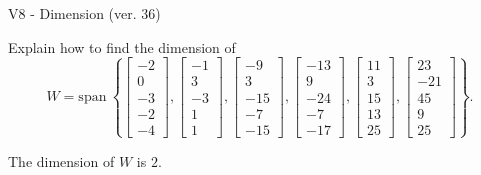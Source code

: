 \begin{exercise}
  \begin{exerciseTitle}V8 - Dimension (ver. 36)\end{exerciseTitle}
  \begin{exerciseStatement}
    Explain how to find the dimension of 
\[W=\mathrm{span}\ \left\{\left[\begin{array}{r}
-2 \\
0 \\
-3 \\
-2 \\
-4
\end{array}\right] , \left[\begin{array}{r}
-1 \\
3 \\
-3 \\
1 \\
1
\end{array}\right] , \left[\begin{array}{r}
-9 \\
3 \\
-15 \\
-7 \\
-15
\end{array}\right] , \left[\begin{array}{r}
-13 \\
9 \\
-24 \\
-7 \\
-17
\end{array}\right] , \left[\begin{array}{r}
11 \\
3 \\
15 \\
13 \\
25
\end{array}\right] , \left[\begin{array}{r}
23 \\
-21 \\
45 \\
9 \\
25
\end{array}\right]\right\}.\]



  \end{exerciseStatement}
  \begin{exerciseAnswer}
   The dimension of \(W\) is  \(2\).
  


  \end{exerciseAnswer}
\end{exercise}